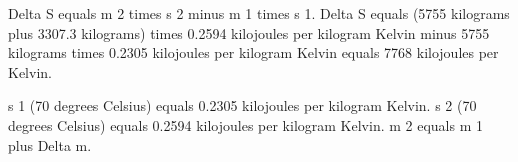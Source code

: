 Delta S equals m 2 times s 2 minus m 1 times s 1.  
Delta S equals (5755 kilograms plus 3307.3 kilograms) times 0.2594 kilojoules per kilogram Kelvin minus 5755 kilograms times 0.2305 kilojoules per kilogram Kelvin equals 7768 kilojoules per Kelvin.  

s 1 (70 degrees Celsius) equals 0.2305 kilojoules per kilogram Kelvin.  
s 2 (70 degrees Celsius) equals 0.2594 kilojoules per kilogram Kelvin.  
m 2 equals m 1 plus Delta m.